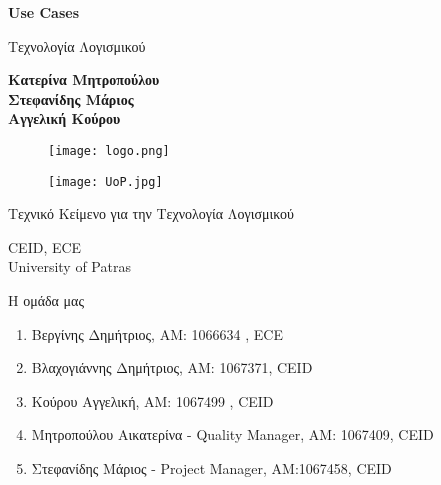 \documentclass{article}
\begin{document}

\begin{titlepage}
   \begin{center}
       \vspace*{1cm}

       \textbf{\huge Use Cases}

       \vspace{0.5cm}
        Τεχνολογία Λογισμικού
            
       \vspace{1cm}

       \textbf{Κατερίνα Μητροπούλου\\Στεφανίδης Μάριος\\Αγγελική Κούρου}
       
       \begin{figure}[!htb]
        \centering
        \texttt{[image: logo.png]}
        \end{figure}
        
        \vspace{0.5cm}
        
        \begin{figure}[!htb]
        \centering
        \texttt{[image: UoP.jpg]}
        \end{figure}


       \vfill
            
       Τεχνικό Κείμενο για την Τεχνολογία Λογισμικού\\
            
       \vspace{0.5cm}
            
       CEID, ECE\\
       University of Patras\\
            
   \end{center}
\end{titlepage}


 \noindent Η ομάδα μας

\begin{enumerate}
  \item Βεργίνης Δημήτριος, ΑΜ: 1066634 , ECE
  \item Βλαχογιάννης Δημήτριος, ΑΜ: 1067371, CEID
  \item Κούρου Αγγελική, ΑΜ: 1067499 , CEID
  \item Μητροπούλου Αικατερίνα - Quality Manager, ΑΜ: 1067409, CEID
  \item Στεφανίδης Μάριος - Project Manager, ΑΜ:1067458, CEID
\end{enumerate}
\end{document}

